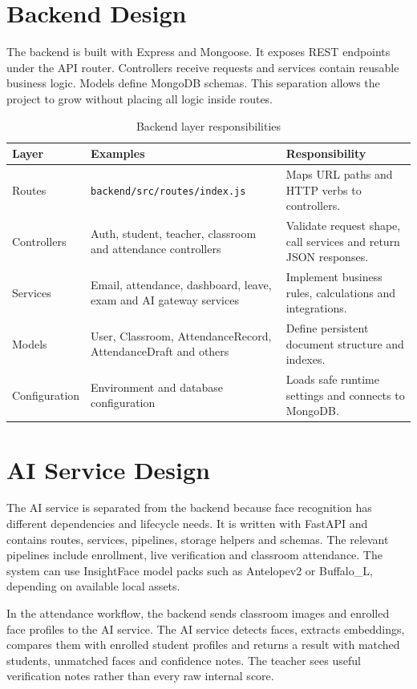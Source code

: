 \section{Backend Design}

The backend is built with Express and Mongoose. It exposes REST endpoints under the API router. Controllers receive requests and services contain reusable business logic. Models define MongoDB schemas. This separation allows the project to grow without placing all logic inside routes.

\begin{table}[H]
\centering
\caption{Backend layer responsibilities}
\label{tab:backend-layers}
\begin{tabularx}{\textwidth}{p{3.2cm} X X}
\toprule
\textbf{Layer} & \textbf{Examples} & \textbf{Responsibility}\\
\midrule
Routes & \texttt{backend/src/routes/index.js} & Maps URL paths and HTTP verbs to controllers.\\
Controllers & Auth, student, teacher, classroom and attendance controllers & Validate request shape, call services and return JSON responses.\\
Services & Email, attendance, dashboard, leave, exam and AI gateway services & Implement business rules, calculations and integrations.\\
Models & User, Classroom, AttendanceRecord, AttendanceDraft and others & Define persistent document structure and indexes.\\
Configuration & Environment and database configuration & Loads safe runtime settings and connects to MongoDB.\\
\bottomrule
\end{tabularx}
\end{table}

\section{AI Service Design}

The AI service is separated from the backend because face recognition has different dependencies and lifecycle needs. It is written with FastAPI and contains routes, services, pipelines, storage helpers and schemas. The relevant pipelines include enrollment, live verification and classroom attendance. The system can use InsightFace model packs such as Antelopev2 or Buffalo\_L, depending on available local assets.

In the attendance workflow, the backend sends classroom images and enrolled face profiles to the AI service. The AI service detects faces, extracts embeddings, compares them with enrolled student profiles and returns a result with matched students, unmatched faces and confidence notes. The teacher sees useful verification notes rather than every raw internal score.

